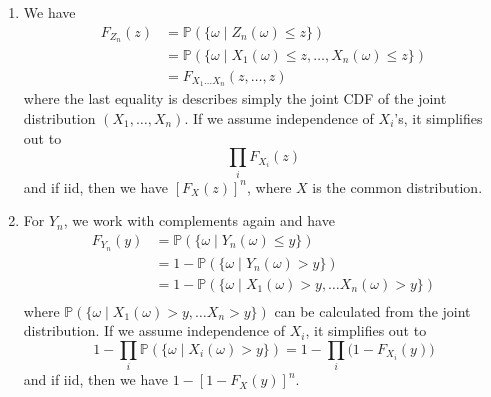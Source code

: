     \begin{enumerate}
      \item We have 
      \begin{align*}
        F_{Z_n} (z) & = \mathbb{P}(\{ \omega \mid Z_n (\omega) \leq z \}) \\
        & = \mathbb{P}(\{ \omega \mid X_1 (\omega) \leq z, \ldots, X_n (\omega) \leq z\}) \\
        & = F_{X_1 \ldots X_n} (z, \ldots, z)
      \end{align*}
      where the last equality is describes simply the joint CDF of the joint distribution $(X_1, \ldots, X_n)$. If we assume independence of $X_i$'s, it simplifies out to 
      \begin{equation}
        \prod_{i} F_{X_i} (z)
      \end{equation}
      and if iid, then we have $[F_{X} (z) ]^n$, where $X$ is the common distribution. 
      \item For $Y_n$, we work with complements again and have 
      \begin{align*}
        F_{Y_n} (y) & = \mathbb{P}(\{ \omega \mid Y_n (\omega) \leq y \}) \\ 
        & = 1 - \mathbb{P}(\{ \omega \mid Y_n (\omega) > y \}) \\
        & = 1 - \mathbb{P}(\{ \omega \mid X_1 (\omega) > y, \ldots X_n (\omega) > y \}) \\
      \end{align*}
      where $\mathbb{P}(\{ \omega \mid X_1 (\omega) > y, \ldots X_n > y \})$ can be calculated from the joint distribution. If we assume independence of $X_i$, it simplifies out to 
      \begin{equation}
        1 - \prod_{i} \mathbb{P}(\{\omega \mid X_i(\omega) > y \}) = 1 - \prod_{i} \big( 1 - F_{X_i} (y) \big)
      \end{equation}
      and if iid, then we have $1 - [1 - F_{X} (y)]^n$. 
    \end{enumerate}

